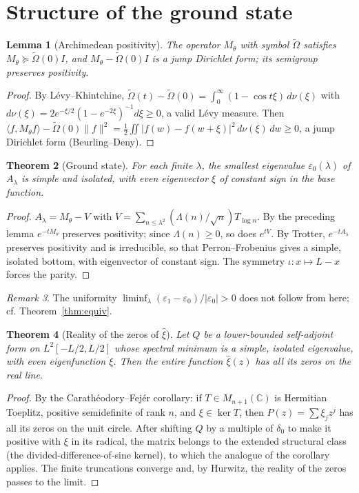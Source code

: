\documentclass[11pt]{amsart}
\newtheorem{theorem}{Theorem}[section]
\newtheorem{lemma}[theorem]{Lemma}
\theoremstyle{definition}
\theoremstyle{remark}
\newtheorem{remark}[theorem]{Remark}
\newcommand{\Om}{\widetilde\Omega}
\newcommand{\ve}{\varepsilon}
\begin{document}
\section{Structure of the ground state}

\begin{lemma}[Archimedean positivity]
The operator $M_\theta$ with symbol $\Om$ satisfies $M_\theta\succeq\Om(0)I$, and
$M_\theta-\Om(0)I$ is a jump Dirichlet form; its semigroup preserves positivity.
\end{lemma}
\begin{proof}
By Lévy--Khintchine,
$\Om(t)-\Om(0)=\int_0^\infty(1-\cos t\xi)\,d\nu(\xi)$ with
$d\nu(\xi)=2e^{-\xi/2}(1-e^{-2\xi})^{-1}d\xi\ge0$, a valid Lévy measure. Then
$\langle f,M_\theta f\rangle-\Om(0)\|f\|^2=\tfrac12\iint|f(w)-f(w+\xi)|^2\,d\nu(\xi)\,dw\ge0$,
a jump Dirichlet form (Beurling--Deny).
\end{proof}

\begin{theorem}[Ground state]
For each finite $\lambda$, the smallest eigenvalue $\ve_0(\lambda)$ of $A_\lambda$ is simple and
isolated, with even eigenvector $\xi$ of constant sign in the base function.
\end{theorem}
\begin{proof}
$A_\lambda=M_\theta-V$ with $V=\sum_{n\le\lambda^2}(\Lambda(n)/\sqrt n)T_{\log n}$. By the
preceding lemma $e^{-tM_\theta}$ preserves positivity; since $\Lambda(n)\ge0$, so does
$e^{tV}$. By Trotter, $e^{-tA_\lambda}$ preserves positivity and is irreducible, so that
Perron--Frobenius gives a simple, isolated bottom, with eigenvector of constant sign. The
symmetry $\iota:x\mapsto L-x$ forces the parity.
\end{proof}

\begin{remark}
The uniformity $\liminf_\lambda(\ve_1-\ve_0)/|\ve_0|>0$ does not follow from here; cf.
Theorem~\ref{thm:equiv}.
\end{remark}

\begin{theorem}[Reality of the zeros of $\hat\xi$]
Let $Q$ be a lower-bounded self-adjoint form on $L^2[-L/2,L/2]$ whose spectral minimum is a
simple, isolated eigenvalue, with even eigenfunction $\xi$. Then the entire function $\hat\xi(z)$
has all its zeros on the real line.
\end{theorem}
\begin{proof}
By the Carathéodory--Fejér corollary: if $T\in M_{n+1}(\mathbb C)$ is Hermitian Toeplitz,
positive semidefinite of rank $n$, and $\xi\in\ker T$, then $P(z)=\sum\xi_jz^j$ has all
its zeros on the unit circle. After shifting $Q$ by a multiple of $\delta_0$ to make it
positive with $\xi$ in its radical, the matrix belongs to the extended structural class (the
divided-difference-of-sine kernel), to which the analogue of the corollary applies. The
finite truncations converge and, by Hurwitz, the reality of the zeros passes to the limit.
\end{proof}
\end{document}
